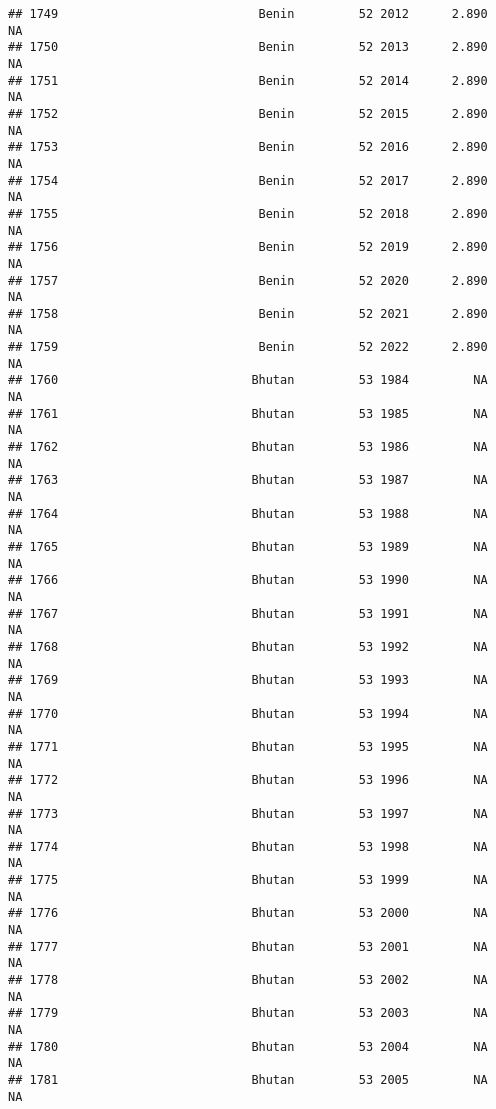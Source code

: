 \documentclass[
]{article}
\begin{document}
\begin{verbatim}
## 1749                            Benin         52 2012      2.890         NA
## 1750                            Benin         52 2013      2.890         NA
## 1751                            Benin         52 2014      2.890         NA
## 1752                            Benin         52 2015      2.890         NA
## 1753                            Benin         52 2016      2.890         NA
## 1754                            Benin         52 2017      2.890         NA
## 1755                            Benin         52 2018      2.890         NA
## 1756                            Benin         52 2019      2.890         NA
## 1757                            Benin         52 2020      2.890         NA
## 1758                            Benin         52 2021      2.890         NA
## 1759                            Benin         52 2022      2.890         NA
## 1760                           Bhutan         53 1984         NA         NA
## 1761                           Bhutan         53 1985         NA         NA
## 1762                           Bhutan         53 1986         NA         NA
## 1763                           Bhutan         53 1987         NA         NA
## 1764                           Bhutan         53 1988         NA         NA
## 1765                           Bhutan         53 1989         NA         NA
## 1766                           Bhutan         53 1990         NA         NA
## 1767                           Bhutan         53 1991         NA         NA
## 1768                           Bhutan         53 1992         NA         NA
## 1769                           Bhutan         53 1993         NA         NA
## 1770                           Bhutan         53 1994         NA         NA
## 1771                           Bhutan         53 1995         NA         NA
## 1772                           Bhutan         53 1996         NA         NA
## 1773                           Bhutan         53 1997         NA         NA
## 1774                           Bhutan         53 1998         NA         NA
## 1775                           Bhutan         53 1999         NA         NA
## 1776                           Bhutan         53 2000         NA         NA
## 1777                           Bhutan         53 2001         NA         NA
## 1778                           Bhutan         53 2002         NA         NA
## 1779                           Bhutan         53 2003         NA         NA
## 1780                           Bhutan         53 2004         NA         NA
## 1781                           Bhutan         53 2005         NA         NA

\end{verbatim}
\end{document}
